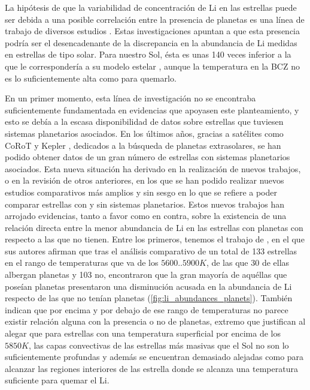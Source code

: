 La hipótesis de que la variabilidad de concentración de Li en las estrellas puede ser debida a una posible correlación entre la presencia de planetas es una línea de trabajo de diversos estudios \cite{Israelian2009, DelgadoMena2014, Figueira2014}. Estas investigaciones apuntan a que esta presencia podría ser el desencadenante de la discrepancia en la abundancia de Li medidas en estrellas de tipo solar. Para nuestro Sol, ésta es unas 140 veces inferior a la que le correspondería a su modelo estelar \cite{Israelian2009}, aunque la temperatura en la BCZ no es lo suficientemente alta como para quemarlo.\par

En un primer momento, esta línea de investigación no se encontraba suficientemente fundamentada en evidencias que apoyasen este planteamiento, y esto se debía a la escasa disponibilidad de datos sobre estrellas que tuviesen sistemas planetarios asociados. En los últimos años, gracias a satélites como CoRoT \cite{Baglin2006} y Kepler \cite{Borucki2010}, dedicados a la búsqueda de planetas extrasolares, se han podido obtener datos de un gran número de estrellas con sistemas planetarios asociados. Esta nueva situación ha derivado en la realización de nuevos trabajos, o en la revisión de otros anteriores, en los que se han podido realizar nuevos estudios comparativos más amplios y sin sesgo en lo que se refiere a poder comparar estrellas con y sin sistemas planetarios. Estos nuevos trabajos han arrojado evidencias, tanto a favor como en contra, sobre la existencia de una relación directa entre la menor abundancia de Li en las estrellas con planetas con respecto a las que no tienen. Entre los primeros, tenemos el trabajo de \cite{Israelian2009}, en el que sus autores afirman que tras el análisis comparativo de un total de 133 estrellas en el rango de temperaturas que va de los $5600..5900 K$, de las que 30 de ellas albergan planetas y 103 no, encontraron que la gran mayoría de aquéllas que poseían planetas presentaron una disminución acusada en la abundancia de Li respecto de las que no tenían planetas (\ref{fig:li_abundances_planets}). También indican que por encima y por debajo de ese rango de temperaturas no parece existir relación alguna con la presencia o no de planetas, extremo que justifican al alegar que para estrellas con una temperatura superficial por encima de los $5850 K$, las capas convectivas de las estrellas más masivas que el Sol no son lo suficientemente profundas y además se encuentran demasiado alejadas como para alcanzar las regiones interiores de las estrella donde se alcanza una temperatura suficiente para quemar el Li.\par

